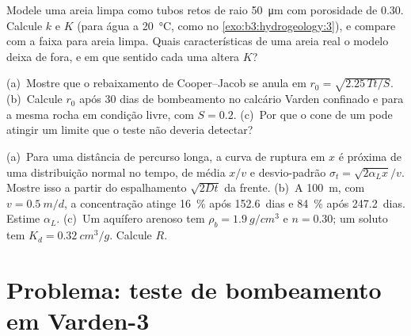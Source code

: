 \begin{exercise}[$\star\star\star$]\label{exo:b3:hydrogeology:10}
Modele uma areia limpa como tubos retos de raio \qty{50}{\micro\metre} com
porosidade de 0.30. Calcule $k$ e $K$ (para água a \qty{20}{\celsius}, como no
\cref{exo:b3:hydrogeology:3}),
e compare com a faixa para areia limpa. Quais características de uma areia real
o modelo deixa de fora, e em que sentido cada uma altera $K$?
\end{exercise}

\begin{exercise}[$\star\star\star$]\label{exo:b3:hydrogeology:11}
  (a)~Mostre que o rebaixamento de Cooper--Jacob se anula em $r_0 =
\sqrt{2.25\,Tt/S}$. (b)~Calcule $r_0$ após 30 dias de bombeamento no
calcário Varden confinado e para a mesma rocha em condição livre, com $S =
0.2$. (c)~Por que o cone de um  pode atingir um limite que o
teste não deveria detectar?
\end{exercise}

\begin{exercise}[$\star\star\star$]\label{exo:b3:hydrogeology:12}
(a)~Para uma distância de percurso longa, a curva de ruptura em $x$ é próxima de uma
distribuição normal no tempo, de média $x/v$ e desvio-padrão $\sigma_t
= \sqrt{2\alpha_Lx}/v$. Mostre isso a partir do espalhamento $\sqrt{2Dt}$ da frente.
(b)~A \qty{100}{m}, com $v = \qty{0.5}{m/d}$, a concentração atinge
\qty{16}{\percent} após \num{152.6}~dias e \qty{84}{\percent} após
\num{247.2}~dias. Estime $\alpha_L$. (c)~Um aquífero arenoso tem $\rho_b =
\qty{1.9}{g/cm^3}$ e $n = 0.30$; um soluto tem $K_d =
\qty{0.32}{cm^3/g}$. Calcule $R$.
\end{exercise}

\section{Problema: teste de bombeamento em Varden-3}

